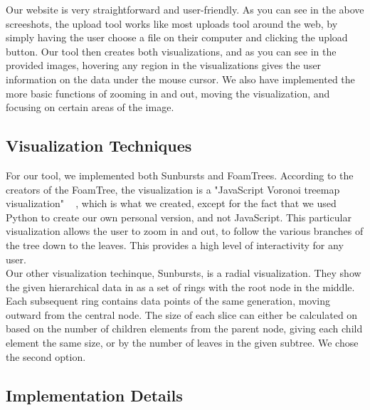 \documentclass[journal, 9pt]{vgtc}                %
\begin{document}
Our website is very straightforward and user-friendly. As you can see in the above screeshots, the upload tool works like most uploads tool around the web, by simply having the
user choose a file on their computer and clicking the upload button. Our tool then creates both visualizations, and as you can see in the provided images, hovering any region in the
visualizations gives the user information on the data under the mouse cursor. We also have implemented the more basic functions of zooming in and out, moving the visualization,
and focusing on certain areas of the image.

\subsection{Visualization Techniques}


For our tool, we implemented both Sunbursts and FoamTrees. According to the creators of the FoamTree, the visualization is a "JavaScript Voronoi treemap
visualization" ~\cite{Matela2011} , which is what we created, except for the fact that we used Python to create our own personal version, and not JavaScript.
This particular visualization allows the user to zoom in and out, to follow the various branches of the tree down to the leaves. This provides a high level of
interactivity for any user.\\
Our other visualization techinque, Sunbursts, is a radial visualization. They show the given hierarchical data in as a set of rings with the root node in the middle. Each subsequent ring contains
data points of the same generation, moving outward from the central node. The size of each slice can either be calculated on based on the number of children
elements from the parent node, giving each child element the same size, or by the number of leaves in the given subtree. We chose the second option.


\subsection{Implementation Details}
\end{document}
